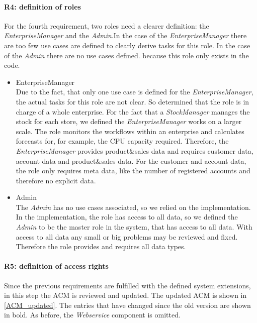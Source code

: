 \paragraph{R4: definition of roles}
For the fourth requirement, two roles need a clearer definition: the \textit{EnterpriseManager} and the \textit{Admin}.In the case of the \textit{EnterpriseManager} there are too few use cases are defined to clearly derive tasks for this role. In the case of the \textit{Admin} there are no use cases defined. because this role only exists in the code. 
\begin{itemize}
\item EnterpriseManager \\
Due to the fact, that only one use case is defined for the \textit{EnterpriseManager}, the actual tasks for this role are not clear. So determined that the role is in charge of a whole enterprise. For the fact that a \textit{StockManager} manages the stock for each store, we defined the \textit{EnterpriseManager} works on a larger scale. The role monitors the workflows within an enterprise and calculates forecasts for, for example, the CPU capacity required. Therefore, the \textit{EnterpriseManager} provides product\&sales data and requires customer data, account data and product\&sales data. For the customer and account data, the role only requires meta data, like the number of registered accounts and therefore no explicit data. 
\item Admin \\
The \textit{Admin} has no use cases associated, so we relied on the implementation. In the implementation, the role has access to all data, so we defined the \textit{Admin} to be the master role in the system, that has access to all data. With access to all data any small or big problems may be reviewed and fixed. Therefore the role provides and requires all data types.
\end{itemize}
\paragraph{R5: definition of access rights}
Since the previous requirements are  fulfilled with the defined system extensions, in this step the ACM is reviewed and updated. The updated ACM is shown in \autoref{ACM_updated}. The entries that have changed since the old version are shown in bold. As before, the \textit{Webservice} component is omitted.

